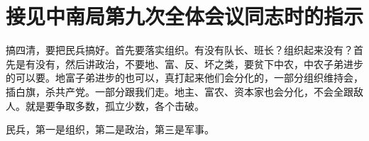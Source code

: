 \section[接见中南局第九次全体会议同志时的指示（一九六五年四月二十一日）]{接见中南局第九次全体会议同志时的指示}


搞四清，要把民兵搞好。首先要落实组织。有没有队长、班长？组织起来没有？首先是有没有，然后讲政治，不要地、富、反、坏之类，要贫下中农，中农子弟进步的可以要。地富子弟进步的也可以，真打起来他们会分化的，一部分组织维持会，插白旗，杀共产党。一部分跟我们走。地主、富农、资本家也会分化，不会全跟敌人。就是要争取多数，孤立少数，各个击破。

民兵，第一是组织，第二是政治，第三是军事。


